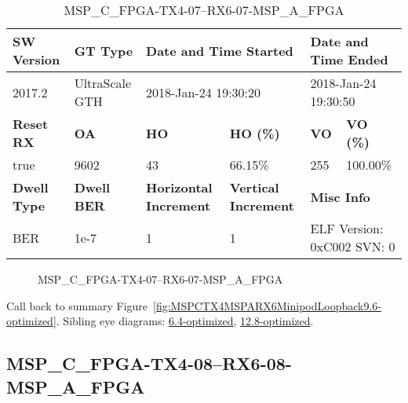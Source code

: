 \begin{table}[h]
\centering
\caption{MSP\_C\_FPGA-TX4-07--RX6-07-MSP\_A\_FPGA}
\label{tab:MSPCFPGATX407RX607MSPAFPGA9.6-optimized}
\begin{tabular}{@{}|l|l|l|l|l|l|@{}}
\toprule
\textbf{SW Version}                & \textbf{GT Type}   & \multicolumn{2}{l|}{\textbf{Date and Time Started}}            & \multicolumn{2}{l|}{\textbf{Date and Time Ended}}        \\ \midrule
2017.2                       & UltraScale GTH          & \multicolumn{2}{l|}{2018-Jan-24 19:30:20}                   & \multicolumn{2}{l|}{2018-Jan-24 19:30:50}               \\ \midrule
\textbf{Reset RX}                  & \textbf{OA} & \textbf{HO}   & \textbf{HO (\%)} & \textbf{VO} & \textbf{VO (\%)} \\ \midrule
true & 9602        & 43          & 66.15\%        & 255        & 100.00\%       \\ \midrule
\textbf{Dwell Type}                & \textbf{Dwell BER} & \textbf{Horizontal Increment} & \textbf{Vertical Increment}    & \multicolumn{2}{l|}{\textbf{Misc Info}}                  \\ \midrule
BER                            & 1e-7        & 1        & 1           & \multicolumn{2}{l|}{ELF Version: 0xC002 SVN: 0}                         \\ \bottomrule
\end{tabular}
\end{table}

\begin{figure}[h]
\caption{MSP\_C\_FPGA-TX4-07--RX6-07-MSP\_A\_FPGA} \label{fig:MSPCFPGATX407RX607MSPAFPGA9.6-optimized}
\end{figure}

Call back to summary Figure~\ref{fig:MSPCTX4MSPARX6MinipodLoopback9.6-optimized}.
Sibling eye diagrams: \hyperref[sec:MSPCFPGATX407RX607MSPAFPGA6.4-optimized]{6.4-optimized}, \hyperref[sec:MSPCFPGATX407RX607MSPAFPGA12.8-optimized]{12.8-optimized}.

\clearpage
\newpage


\subsection{MSP\_C\_FPGA-TX4-08--RX6-08-MSP\_A\_FPGA}\label{sec:MSPCFPGATX408RX608MSPAFPGA9.6-optimized}


